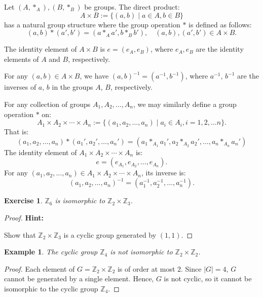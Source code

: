 \documentclass[a4paper,12pt]{report}
\newcommand{\abs}[1]{\left|#1\right|}
\newcounter{statement}
\numberwithin{statement}{chapter}
\newtheorem{eg}[statement]{\bf Example}
\newtheorem{ex}[statement]{\bf Exercise}
\numberwithin{equation}{chapter}
\numberwithin{section}{chapter}
\numberwithin{subsection}{section}
\begin{document}
Let $(A, \ast_A), (B, \ast_B)$ be groups.  The direct product:
\[
A \times B := \{(a, b)\;|\; a\in A, b \in B\}
\]
has a natural group structure
where the group operation $\ast$ is defined as follows:
\[
(a, b)\ast(a', b') = (a\ast_A a', b\ast_B b'), \quad (a, b), (a', b') \in A\times B.
\]

The identity element of $A \times B$ is $e = (e_A, e_B)$, where $e_A, e_B$
are the identity elements of $A$ and $B$, respectively.




For any $(a, b) \in A \times B$, we have $(a, b)^{-1} = (a^{-1}, b^{-1})$,
where $a^{-1}$, $b^{-1}$ are the inverses of $a$, $b$ in the groups $A$, $B$,
respectively.




For any collection of groups $A_1, A_2, \ldots, A_n$,
we may similarly define a group operation $\ast$ on:
\[
A_1 \times A_2 \times \cdots \times A_n
:= \{(a_1, a_2, \ldots, a_n)\;|\;a_i \in A_i, i = 1, 2, \ldots n\}.
\]
That is:
\[
(a_1, a_2, \ldots, a_n)\ast (a_1', a_2', \ldots, a_n')
=
(a_1\ast_{A_1} a_1', a_2\ast_{A_2} a_2', \ldots, a_n \ast_{A_n} a_n')
\]
The identity element of $A_1 \times A_2 \times \cdots \times A_n$ is:
\[
e = (e_{A_1}, e_{A_2}, \ldots, e_{A_n}).
\]
For any $(a_1, a_2, \ldots, a_n) \in A_1 \times A_2 \times \cdots \times A_n$,
its inverse is:
\[
(a_1, a_2, \ldots, a_n)^{-1} = (a_1^{-1}, a_2^{-1}, \ldots, a_n^{-1}).
\]


\begin{ex}
$\mathbb{Z}_6$ is isomorphic to $\mathbb{Z}_2\times\mathbb{Z}_3$.
\end{ex}
\begin{proof}

 {\bf Hint:} 



Show that $\mathbb{Z}_2\times\mathbb{Z}_3$ is a cyclic group generated by $(1, 1)$.
\end{proof}
\begin{eg}

The cyclic group $\mathbb{Z}_4$ is not isomorphic to $\mathbb{Z}_2 \times \mathbb{Z}_2$.
\end{eg}
\begin{proof}

Each element of $G = \mathbb{Z}_2\times\mathbb{Z}_2$ is of order at most $2$.
Since $\abs{G} = 4$, $G$ cannot be generated by a single element.
Hence, $G$ is not cyclic,
so it cannot be isomorphic to the cyclic group $\mathbb{Z}_4$.


\end{proof}
\end{document}
